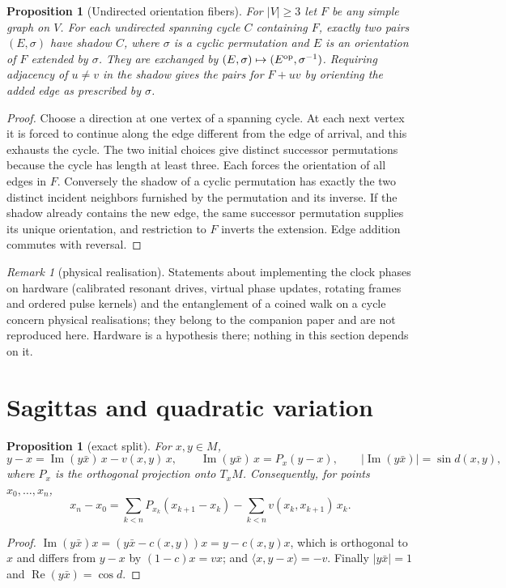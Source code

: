 \documentclass[11pt,reqno]{amsart}
\newtheorem{proposition}[theorem]{Proposition}
\theoremstyle{definition}
\theoremstyle{remark}
\newtheorem{remark}[theorem]{Remark}
\numberwithin{equation}{section}
\newcommand{\re}{\operatorname{Re}}
\newcommand{\im}{\operatorname{Im}}
\newcommand{\ip}[2]{\langle #1,#2\rangle}
\begin{document}
\begin{proposition}[Undirected orientation fibers]\label{m4:orientation}
For $|V|\ge3$ let $F$ be any simple graph on $V$. For each undirected spanning cycle $C$ containing $F$, exactly two pairs $(E,\sigma)$ have shadow $C$, where $\sigma$ is a cyclic permutation and $E$ is an orientation of $F$ extended by $\sigma$. They are exchanged by $(E,\sigma)\mapsto(E^{\rm op},\sigma^{-1})$. Requiring adjacency of $u\ne v$ in the shadow gives the pairs for $F+uv$ by orienting the added edge as prescribed by $\sigma$.
\end{proposition}
\begin{proof}
Choose a direction at one vertex of a spanning cycle. At each next vertex it is forced to continue along the edge different from the edge of arrival, and this exhausts the cycle. The two initial choices give distinct successor permutations because the cycle has length at least three. Each forces the orientation of all edges in $F$. Conversely the shadow of a cyclic permutation has exactly the two distinct incident neighbors furnished by the permutation and its inverse. If the shadow already contains the new edge, the same successor permutation supplies its unique orientation, and restriction to $F$ inverts the extension. Edge addition commutes with reversal.
\end{proof}


\begin{remark}[physical realisation]\label{m4:physical}
Statements about implementing the clock phases on hardware (calibrated resonant drives, virtual phase updates, rotating frames and
ordered pulse kernels) and the entanglement of a coined walk on a cycle concern physical realisations; they belong to the companion
paper and are not reproduced here.  Hardware is a hypothesis there; nothing in this section depends on it.
\end{remark}

\setcounter{section}{6}
\renewcommand{\thesection}{\arabic{section}}
\renewcommand{\theHsection}{\arabic{section}}

\section{Sagittas and quadratic variation}

\begin{proposition}[exact split]\label{prop:split}
For $x,y\in M$,
\[
y-x=\im(y\bar x)\,x-v(x,y)\,x,\qquad \im(y\bar x)\,x=P_x(y-x),\qquad \lvert\im(y\bar x)\rvert=\sin d(x,y),
\]
where $P_x$ is the orthogonal projection onto $T_xM$.  Consequently, for points $x_0,\dots,x_n$,
\[
x_n-x_0=\sum_{k<n}P_{x_k}(x_{k+1}-x_k)-\sum_{k<n}v(x_k,x_{k+1})\,x_k .
\]
\end{proposition}
\begin{proof}
$\im(y\bar x)x=(y\bar x-c(x,y))x=y-c(x,y)x$, which is orthogonal to $x$ and differs from $y-x$ by
$(1-c)x=vx$; and $\ip x{y-x}=-v$.  Finally $\lvert y\bar x\rvert=1$ and $\re(y\bar x)=\cos d$.
\end{proof}
\end{document}
